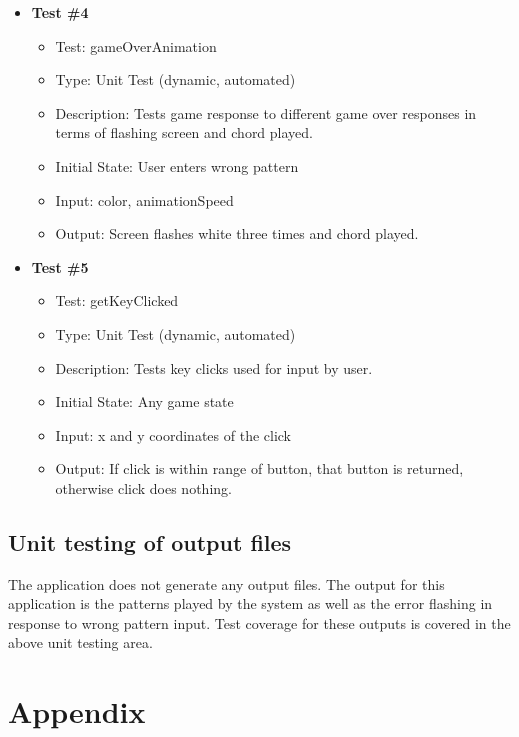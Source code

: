 \documentclass[12pt, titlepage]{article}
\begin{document}
\begin{itemize}
\item \textbf{Test \#4}
\begin{itemize}
\item Test: gameOverAnimation
\item Type: Unit Test (dynamic, automated)			
\item Description: Tests game response to different game over responses in terms of flashing screen and chord played.	
\item Initial State: User enters wrong pattern
\item Input: color, animationSpeed
\item Output: Screen flashes white three times and chord played.		
\end{itemize}

\item \textbf{Test \#5}
\begin{itemize}
\item Test: getKeyClicked
\item Type: Unit Test (dynamic, automated)				
\item Description: Tests key clicks used for input by user.	
\item Initial State: Any game state 	
\item Input: x and y coordinates of the click
\item Output: If click is within range of button, that button is returned, otherwise click does nothing.		
\end{itemize}

\end{itemize}

		
\subsection{Unit testing of output files}	
The application does not generate any output files. The output for this application is the patterns played by the system as well as the error flashing in response to wrong pattern input. Test coverage for these outputs is covered in the above unit testing area.


\newpage
\section{Appendix}
\end{document}
